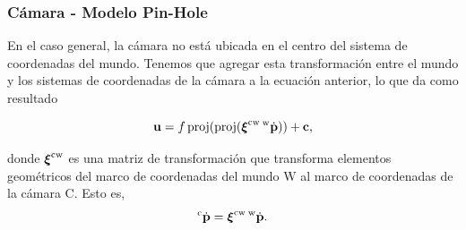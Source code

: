 \begin{frame}
    \frametitle{Cámara - Modelo Pin-Hole}
    
    \footnotesize
    
    En el caso general, la cámara no está ubicada en el centro del sistema de coordenadas del mundo. Tenemos que agregar esta transformación entre el mundo y los sistemas de coordenadas de la cámara a la ecuación anterior, lo que da como resultado
    
    \begin{equation*}
        \boldsymbol{\mathbf{u}}=f\operatorname{proj}(\operatorname{proj}(\boldsymbol{\mathbf{\xi}}^{\mathrm{c}\mathrm{w}}\prescript{\mathrm{\mathrm{w}}}{}{\dot{\boldsymbol{\mathbf{p}}}}))+\boldsymbol{\mathbf{c}},
    \end{equation*}

    donde $\boldsymbol{\mathbf{\xi}}^{\mathrm{c}\mathrm{w}}$ es una matriz de transformación que transforma elementos geométricos del marco de coordenadas del mundo $\mathrm{W}$ al marco de coordenadas de la cámara $\mathrm{C}$. Esto es,
    \begin{equation*}
        \prescript{\mathrm{\mathrm{c}}}{}{\dot{\boldsymbol{\mathbf{p}}}}=\boldsymbol{\mathbf{\xi}}^{\mathrm{c}\mathrm{w}}\prescript{\mathrm{\mathrm{w}}}{}{\dot{\boldsymbol{\mathbf{p}}}}.
    \end{equation*}
   
\end{frame}

